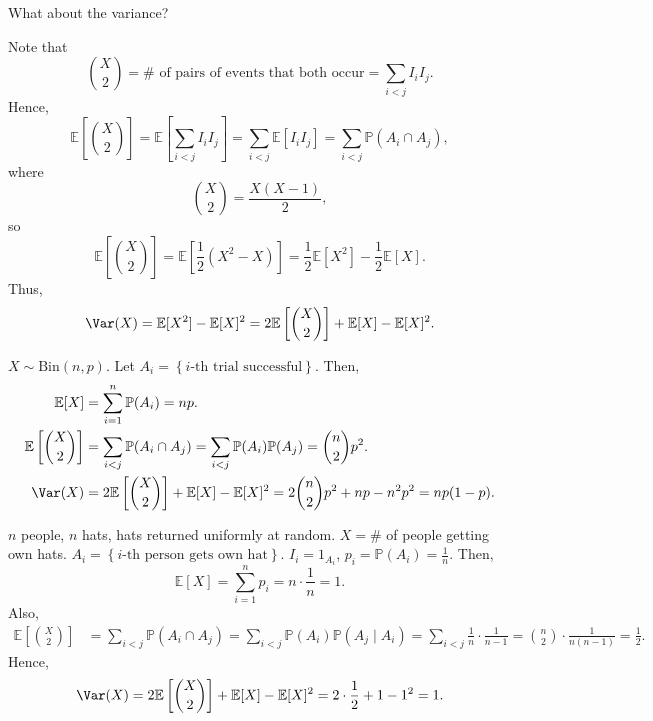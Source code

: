 \begin{question}
    What about the variance?
\end{question}

Note that 
\[
    \binom{X}{2} = \# \text{ of pairs of events that both occur} = \sum_{i < j} I_i I_j.  
\]
Hence,
\[
    \mathbb{E} \left[ \binom{X}{2} \right] = \mathbb{E} \left[ \sum_{i < j} I_i I_j  \right] = \sum_{i < j} \mathbb{E} [I_i I_j] = \sum_{i < j} \mathbb{P} (A_i \cap A_j),    
\]
where 
\[
    \binom{X}{2} = \frac{X(X - 1)}{2},
\]
so 
\[
    \mathbb{E} \left[ \binom{X}{2} \right] = \mathbb{E} \left[ \frac{1}{2} (X^2 - X) \right] = \frac{1}{2} \mathbb{E} [X^2] - \frac{1}{2} \mathbb{E} [X].  
\]
Thus,
\[
    \Var(X) = \mathbb{E} [X^2] - \mathbb{E} [X]^2 = 2 \mathbb{E} \left[ \binom{X}{2} \right] + \mathbb{E} [X] - \mathbb{E} [X]^2. 
\]

\begin{eg}
    \(X \sim \mathrm{Bin}(n, p)\). Let \(A_i = \left\{ i\text{-th trial successful}  \right\} \). Then, 
    \begin{align*}
        \mathbb{E} [X] &= \sum_{i=1}^n \mathbb{P} (A_i) = np. \\
        \mathbb{E} \left[ \binom{X}{2} \right] &= \sum_{i < j} \mathbb{P} (A_i \cap A_j) = \sum_{i < j} \mathbb{P} (A_i) \mathbb{P} (A_j) = \binom{n}{2} p^2. \\
        \Var(X) &= 2 \mathbb{E} \left[ \binom{X}{2} \right] + \mathbb{E} [X] - \mathbb{E} [X]^2 = 2 \binom{n}{2} p^2 + np - n^2 p^2 = np(1 - p).     
    \end{align*}     
\end{eg}

\begin{eg}
    \(n\) people, \(n\) hats, hats returned uniformly at random. \(X = \#\) of people getting own hats. \(A_i = \left\{ i\text{-th person gets own hat}  \right\} \). \(I_i = 1_{A_i}\), \(p_i = \mathbb{P} (A_i) = \frac{1}{n}\). Then,
    \[
        \mathbb{E} [X] = \sum_{i=1}^n p_i = n \cdot \frac{1}{n} = 1. 
    \]      
    Also,
    \begin{align*}
        \mathbb{E} \left[ \binom{X}{2} \right] &= \sum_{i < j} \mathbb{P} (A_i \cap A_j) = \sum_{i < j} \mathbb{P} (A_i) \mathbb{P} (A_j \mid A_i) = \sum_{i < j} \frac{1}{n} \cdot \frac{1}{n - 1} = \binom{n}{2} \cdot \frac{1}{n(n - 1)} = \frac{1}{2}.    
    \end{align*}
    Hence,
    \[
        \Var(X) = 2 \mathbb{E} \left[ \binom{X}{2} \right] + \mathbb{E} [X] - \mathbb{E} [X]^2 = 2 \cdot \frac{1}{2} + 1 - 1^2 = 1. 
    \]
\end{eg}

